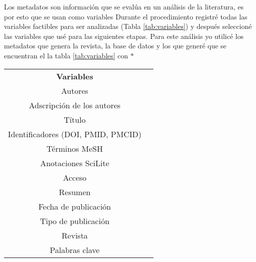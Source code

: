 \documentclass[../Main.tex]{subfiles}
\begin{document}
Los metadatos son información que se evalúa en un análisis de la literatura, es por esto que se usan como variables %
Durante el procedimiento registré todas las variables factibles para ser analizadas (Tabla \ref{tab:variables}) y  después seleccioné las variables que usé para las siguientes etapas. Para este análisis yo utilicé los metadatos que genera la revista, la base de datos y los que generé que se encuentran el la tabla \ref{tab:variables} con $*$  
\begin{table}[H]
\begin{tabular}{|c|c}
\cline{1-1}
\textbf{Variables}                                                                            & \textbf{} \\ \cline{1-1}
\cellcolor[HTML]{EDBED7}Autores                                                               &           \\ \cline{1-1}
Adscripción de los autores                                                                    &           \\ \cline{1-1}
Título                                                                                        &           \\ \cline{1-1}
Identificadores (DOI, PMID, PMCID)                                                            &           \\ \cline{1-1}
\cellcolor[HTML]{EDBED7}Términos MeSH                                                         &           \\ \cline{1-1}
Anotaciones SciLite                                                                           &           \\ \cline{1-1}
Acceso                                                                                        &           \\ \cline{1-1}
Resumen                                                                                       &           \\ \cline{1-1}
Fecha de publicación                                                                          &           \\ \cline{1-1}
Tipo de publicación                                                                           &           \\ \cline{1-1}
\cellcolor[HTML]{EDBED7}Revista                                                               &           \\ \cline{1-1}
\cellcolor[HTML]{EDBED7}Palabras clave                                                        &           \\ \cline{1-1}

\end{tabular}
\end{table}
\end{document}
